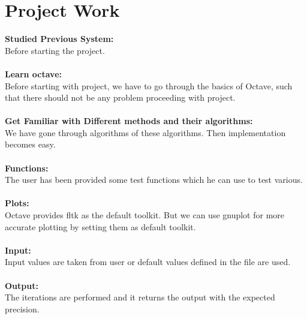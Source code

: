 \section{Project Work} 
\textbf{Studied Previous System:}\\
Before starting the project. \\\\
\textbf{Learn octave:}\\
Before starting with project, we have to go through the basics of Octave, such that there
should not be any problem proceeding with project.\\\\
\textbf{Get Familiar with Different methods and their algorithms:}\\
We have gone through algorithms of these algorithms. Then implementation becomes easy.\\\\
\textbf{Functions:}\\
The user has been provided some test functions which he can use to test various.\\\\
\textbf{Plots:}\\
Octave provides fltk as the default toolkit. But we can use gnuplot for more accurate plotting by setting them as default toolkit.\\\\
\textbf{Input:}\\
Input values are taken from user or default values defined in the file are used.\\\\
\textbf{Output:}\\
The iterations are performed and it returns the output with the expected precision.


